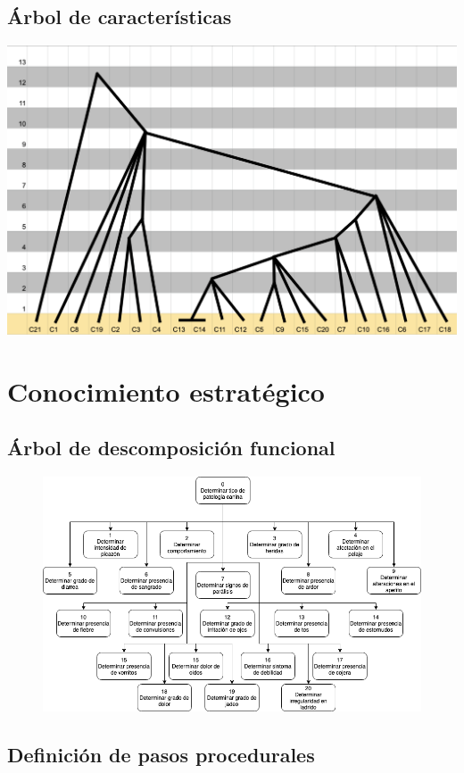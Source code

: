 \documentclass[a4paper,table,xcdraw]{article}
\begin{document}
\subsection{Árbol de características}
\includegraphics[scale=0.6]{./img/arbol_caracteristicas.png}

\section{Conocimiento estratégico}
\subsection{Árbol de descomposición funcional}
\begin{figure}[H]
\centering
\includegraphics[scale=0.60]{./img/arbol_fallas.png}
\end{figure}

\subsection{Definición de pasos procedurales}
\end{document}
